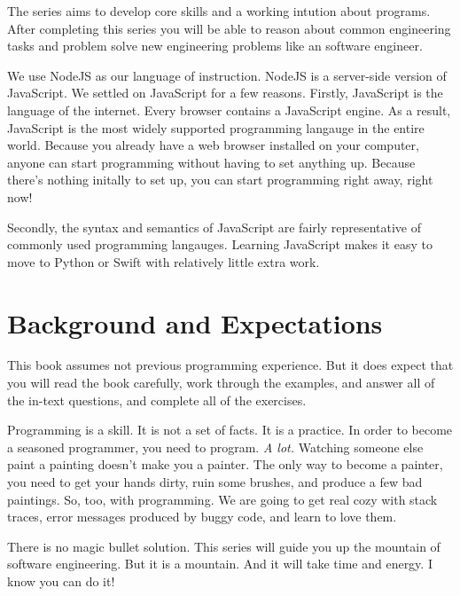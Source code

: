 The series aims to develop core skills and a working intution about programs.
After completing this series you will be able to reason about common engineering
tasks and problem solve new engineering problems like an software engineer.

We use NodeJS as our language of instruction. NodeJS is a server-side version of
JavaScript. We settled on JavaScript for a few reasons. Firstly, JavaScript is
the language of the internet. Every browser contains a JavaScript engine. As a
result, JavaScript is the most widely supported programming langauge in the
entire world. Because you already have a web browser installed on your computer,
anyone can start programming without having to set anything up. Because there's
nothing initally to set up, you can start programming right away, right now!

Secondly, the syntax and semantics of JavaScript are fairly representative of
commonly used programming langauges. Learning JavaScript makes it easy to move
to Python or Swift with relatively little extra work.

\section*{Background and Expectations}
This book assumes not previous programming experience. But it does expect that
you will read the book carefully, work through the examples, and answer all of
the in-text questions, and complete all of the exercises.

Programming is a skill. It is not a set of facts. It is a practice. In order to
become a seasoned programmer, you need to program. \emph{A lot.} Watching
someone else paint a painting doesn't make you a painter. The only way to become
a painter, you need to get your hands dirty, ruin some brushes, and produce a
few bad paintings. So, too, with programming. We are going to get real cozy with
stack traces, error messages produced by buggy code, and learn to love them.

There is no magic bullet solution. This series will guide you up the mountain of
software engineering. But it is a mountain. And it will take time and energy. I
know you can do it!
